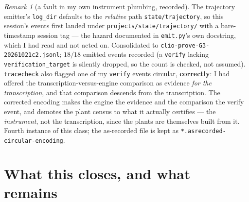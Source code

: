 \documentclass[11pt]{article}
\theoremstyle{definition}
\theoremstyle{remark}
\newtheorem{rem}[thm]{Remark}
\begin{document}
\begin{rem}[a fault in my own instrument plumbing, recorded]
The trajectory emitter's \texttt{log\_dir} defaults to the \emph{relative} path
\texttt{state/trajectory}, so this session's events first landed under
\texttt{projects/state/trajectory/} with a bare-timestamp session tag --- the hazard
documented in \texttt{emit.py}'s own docstring, which I had read and not acted on.
Consolidated to \texttt{clio-prove-G3-20261021c2.jsonl}; $18/18$ emitted events
recorded (a \texttt{verify} lacking \texttt{verification\_target} is silently dropped,
so the count is checked, not assumed).  \texttt{tracecheck} also flagged one of my
\texttt{verify} events circular, \textbf{correctly}: I had offered the
transcription-versus-engine comparison as evidence \emph{for the transcription}, and
that comparison descends from the transcription.  The corrected encoding makes the
engine the evidence and the comparison the verify event, and demotes the plant census
to what it actually certifies --- the \emph{instrument}, not the transcription, since
the plants are themselves built from it.  Fourth instance of this class; the as-recorded
file is kept as \texttt{*.asrecorded-circular-encoding}.
\end{rem}

\section{What this closes, and what remains}
\end{document}
